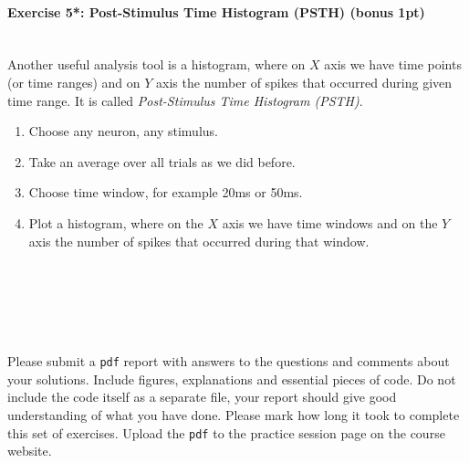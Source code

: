 \documentclass[a4paper,11pt]{article}
\newenvironment{exercise}[3]{\paragraph{Exercise #1: #2 (#3pt)}\ \\}{
\medskip}
\begin{document}
\begin{exercise}{5*}{Post-Stimulus Time Histogram (PSTH)}{bonus 1}
Another useful analysis tool is a histogram, where on $X$ axis we have time points (or time ranges) and on $Y$ axis the number of spikes that occurred during given time range. It is called \emph{Post-Stimulus Time Histogram (PSTH)}.
\begin{enumerate}
	\item Choose any neuron, any stimulus.
	\item Take an average over all trials as we did before.
	\item Choose time window, for example 20ms or 50ms.
	\item Plot a histogram, where on the $X$ axis we have time windows and on the $Y$ axis the number of spikes that occurred during that window.
\end{enumerate}
\end{exercise}



\ \\
\ \\
\ \\
\ \\
\ \\
Please submit a \texttt{pdf} report with answers to the questions and comments about your solutions. Include figures, explanations and essential pieces of code. Do not include the code itself as a separate file, your report should give good understanding of what you have done. Please mark how long it took to complete this set of exercises. Upload the \texttt{pdf} to the practice session page on the course website.
\end{document}
